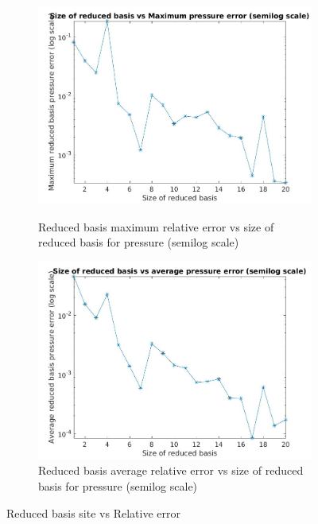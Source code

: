\documentclass[a4paper,oneside,openright,spanish,english]{book}
\begin{document}
  \begin{figure}\ContinuedFloat
  \begin{subfigure}{\textwidth}
  \includegraphics[width=\linewidth,height=0.45\textheight]{size_vs_maximum_reduced_basis_pressure_error_semilog.jpg}
  \caption{Reduced basis maximum relative error vs size of reduced basis for pressure (semilog scale)}
  \label{rb_max_pressure_error_vs_size} 
    \includegraphics[width=\linewidth,height=0.45\textheight]{size_vs_average_reduced_basis_pressure_error_semilog.jpg}
  \caption{Reduced basis average relative error vs size of reduced basis for pressure (semilog scale)}
  \label{rb_avg_pressure_error_vs_size} 
\end{subfigure}
\caption{Reduced basis site vs Relative error}
\label{rb_error_vs_size}
\end{figure}
\end{document}
